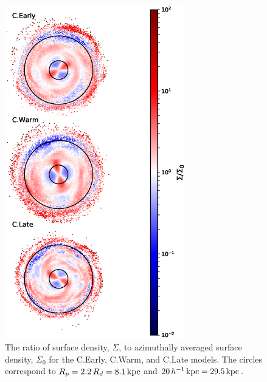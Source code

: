 \begin{figure}
    \centering
    \includegraphics[width=0.7\textwidth]{../figures/surface_density_ratios.eps} \caption{The
      ratio of surface density, $\Sigma$, to azimuthally averaged
      surface density, $\Sigma_0$ for the C.Early, C.Warm, and C.Late
      models. The circles correspond to $R_p = 2.2\, R_d = 8.1 \,\text{kpc}$
      and $20 \,h^{-1} \, \text{kpc} = 29.5 \, \text{kpc}$.}
	\label{fig:final_densities}
\end{figure}

